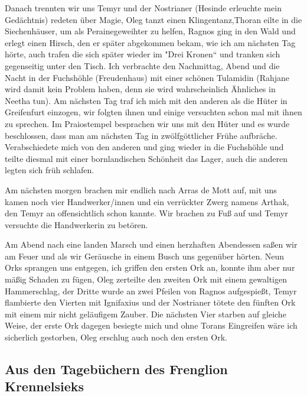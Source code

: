 \documentclass[11pt]{scrreprt}
\begin{document}
Danach trennten wir uns Temyr und der Nostrianer (Hesinde erleuchte mein Gedächtnis) redeten über Magie, Oleg tanzt einen Klingentanz,Thoran eilte in die Siechenhäuser, um als Perainegeweihter zu helfen, Ragnos ging in den Wald und erlegt einen Hirsch, den er später abgekommen bekam, wie ich am nächsten Tag hörte, auch trafen die sich später wieder im "Drei Kronen“ und tranken sich gegenseitig unter den Tisch. Ich verbrachte den Nachmittag, Abend und die Nacht in der Fuchshöhle (Freudenhaus) mit einer schönen Tulamidin (Rahjane wird damit kein Problem haben, denn sie wird wahrscheinlich Ähnliches in Neetha tun). Am nächsten Tag traf ich mich mit den anderen als die Hüter in Greifenfurt einzogen, wir folgten ihnen und einige versuchten schon mal mit ihnen zu sprechen. Im Praiostempel besprachen wir uns mit den Hüter und es wurde beschlossen, dass man am nächsten Tag in zwölfgöttlicher Frühe aufbräche. Verabschiedete mich von den anderen und ging wieder in die Fuchshöhle und teilte diesmal mit einer bornlandischen Schönheit das Lager, auch die anderen legten sich früh schlafen.\par
Am nächsten morgen brachen mir endlich nach Arras de Mott auf, mit uns kamen noch vier Handwerker/innen und ein verrückter Zwerg namens Arthak, den Temyr an offensichtlich schon kannte. Wir brachen zu Fuß auf und Temyr versuchte die Handwerkerin zu betören.\par
Am Abend nach eine landen Marsch und einen herzhaften Abendessen saßen wir am Feuer und als wir Geräusche in einem Busch uns gegenüber hörten. Neun Orks sprangen uns entgegen, ich griffen den ersten Ork an, konnte ihm aber nur mäßig Schaden zu fügen, Oleg zerteilte den zweiten Ork mit einem gewaltigen Hammerschlag, der Dritte wurde an zwei Pfeilen von Ragnos aufgespießt, Temyr flambierte den Vierten mit Ignifaxius und der Nostrianer tötete den fünften Ork mit einem mir nicht geläufigem Zauber. Die nächsten Vier starben auf gleiche Weise, der erste Ork dagegen besiegte mich und ohne Torans Eingreifen wäre ich sicherlich gestorben, Oleg erschlug auch noch den ersten Ork.\par

\subsection{Aus den Tagebüchern des Frenglion Krennelsieks}
\end{document}
